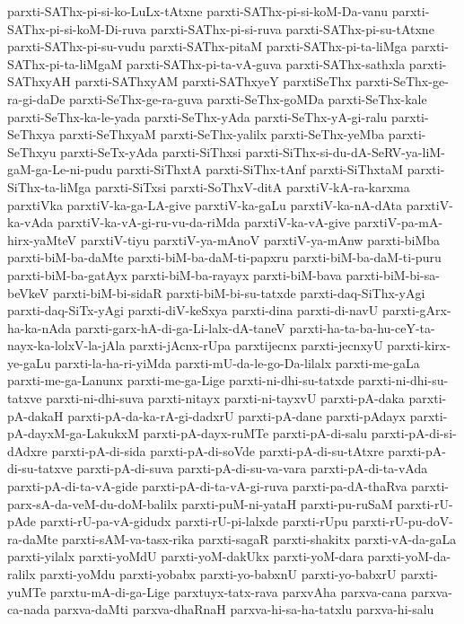{parxti-SAThx-pi-si-ko-LuLx-tAtxne
parxti-SAThx-pi-si-koM-Da-vanu
parxti-SAThx-pi-si-koM-Di-ruva
parxti-SAThx-pi-si-ruva
parxti-SAThx-pi-su-tAtxne
parxti-SAThx-pi-su-vudu
parxti-SAThx-pitaM
parxti-SAThx-pi-ta-liMga
parxti-SAThx-pi-ta-liMgaM
parxti-SAThx-pi-ta-vA-guva
parxti-SAThx-sathxla
parxti-SAThxyAH
parxti-SAThxyAM
parxti-SAThxyeY
parxtiSeThx
parxti-SeThx-ge-ra-gi-daDe
parxti-SeThx-ge-ra-guva
parxti-SeThx-goMDa
parxti-SeThx-kale
parxti-SeThx-ka-le-yada
parxti-SeThx-yAda
parxti-SeThx-yA-gi-ralu
parxti-SeThxya
parxti-SeThxyaM
parxti-SeThx-yalilx
parxti-SeThx-yeMba
parxti-SeThxyu
parxti-SeTx-yAda
parxti-SiThxsi
parxti-SiThx-si-du-dA-SeRV-ya-liM-gaM-ga-Le-ni-pudu
parxti-SiThxtA
parxti-SiThx-tAnf
parxti-SiThxtaM
parxti-SiThx-ta-liMga
parxti-SiTxsi
parxti-SoThxV-ditA
parxtiV-kA-ra-karxma
parxtiVka
parxtiV-ka-ga-LA-give
parxtiV-ka-gaLu
parxtiV-ka-nA-dAta
parxtiV-ka-vAda
parxtiV-ka-vA-gi-ru-vu-da-riMda
parxtiV-ka-vA-give
parxtiV-pa-mA-hirx-yaMteV
parxtiV-tiyu
parxtiV-ya-mAnoV
parxtiV-ya-mAnw
parxti-biMba
parxti-biM-ba-daMte
parxti-biM-ba-daM-ti-papxru
parxti-biM-ba-daM-ti-puru
parxti-biM-ba-gatAyx
parxti-biM-ba-rayayx
parxti-biM-bava
parxti-biM-bi-sa-beVkeV
parxti-biM-bi-sidaR
parxti-biM-bi-su-tatxde
parxti-daq-SiThx-yAgi
parxti-daq-SiTx-yAgi
parxti-diV-keSxya
parxti-dina
parxti-di-navU
parxti-gArx-ha-ka-nAda
parxti-garx-hA-di-ga-Li-lalx-dA-taneV
parxti-ha-ta-ba-hu-ceY-ta-nayx-ka-lolxV-la-jAla
parxti-jAcnx-rUpa
parxtijecnx
parxti-jecnxyU
parxti-kirx-ye-gaLu
parxti-la-ha-ri-yiMda
parxti-mU-da-le-go-Da-lilalx
parxti-me-gaLa
parxti-me-ga-Lanunx
parxti-me-ga-Lige
parxti-ni-dhi-su-tatxde
parxti-ni-dhi-su-tatxve
parxti-ni-dhi-suva
parxti-nitayx
parxti-ni-tayxvU
parxti-pA-daka
parxti-pA-dakaH
parxti-pA-da-ka-rA-gi-dadxrU
parxti-pA-dane
parxti-pAdayx
parxti-pA-dayxM-ga-LakukxM
parxti-pA-dayx-ruMTe
parxti-pA-di-salu
parxti-pA-di-si-dAdxre
parxti-pA-di-sida
parxti-pA-di-soVde
parxti-pA-di-su-tAtxre
parxti-pA-di-su-tatxve
parxti-pA-di-suva
parxti-pA-di-su-va-vara
parxti-pA-di-ta-vAda
parxti-pA-di-ta-vA-gide
parxti-pA-di-ta-vA-gi-ruva
parxti-pa-dA-thaRva
parxti-parx-sA-da-veM-du-doM-balilx
parxti-puM-ni-yataH
parxti-pu-ruSaM
parxti-rU-pAde
parxti-rU-pa-vA-gidudx
parxti-rU-pi-lalxde
parxti-rUpu
parxti-rU-pu-doV-ra-daMte
parxti-sAM-va-tasx-rika
parxti-sagaR
parxti-shakitx
parxti-vA-da-gaLa
parxti-yilalx
parxti-yoMdU
parxti-yoM-dakUkx
parxti-yoM-dara
parxti-yoM-da-ralilx
parxti-yoMdu
parxti-yobabx
parxti-yo-babxnU
parxti-yo-babxrU
parxti-yuMTe
parxtu-mA-di-ga-Lige
parxtuyx-tatx-rava
parxvAha
parxva-cana
parxva-ca-nada
parxva-daMti
parxva-dhaRnaH
parxva-hi-sa-ha-tatxlu
parxva-hi-salu
}

